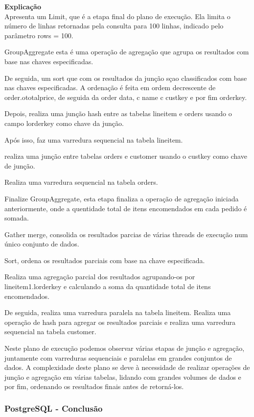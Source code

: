 \documentclass{article}
\begin{document}
\begin{lstlisting}[language=SQL]
\end{lstlisting}

\textbf{Explicação}\\
Apresenta um Limit, que é a etapa final do plano de execução. Ela limita o número de linhas retornadas pela consulta para 100 linhas, indicado pelo parâmetro rows = 100.

GroupAggregate esta é uma operação de agregação que agrupa os resultados com base nas chaves especificadas.

De seguida, um sort que com os resultados da junção sçao classificados com base nas chaves especificadas. A ordenação é feita em ordem decrescente de order.o\underline{}totalprice, de seguida da order data, c name c custkey e por fim orderkey.

Depois, realiza uma junção hash entre as tabelas lineitem e orders usando o campo l\underline{}orderkey como chave da junção.

Após isso, faz uma varredura sequencial na tabela lineitem.

realiza uma junção entre tabelas orders e customer usando o custkey como chave de junção.

Realiza uma varredura sequencial na tabela orders.

Finalize GroupAggregate, esta etapa finaliza a operação de agregação iniciada anteriormente, onde a quentidade total de itens encomendados em cada pedido é somada.

Gather merge, consolida os resultados parcias de várias threads de execução num único conjunto de dados.

Sort, ordena os resultados parciais com base na chave especificada.

Realiza uma agregação parcial dos resultados agrupando-os por lineitem\underline{}1.l\underline{}orderkey e calculando a soma da quantidade total de itens encomendados.

De seguida, realiza uma varredura paralela na tabela lineitem. Realiza uma operação de hash para agregar os resultados parciais e realiza uma varredura sequencial na tabela customer.

Neste plano de execução podemos observar várias etapas de junção e agregação, juntamente com varreduras sequenciais e paralelas em grandes conjuntos de dados. A complexidade deste plano se deve à necessidade de realizar operações de junção e agregação em várias tabelas, lidando com grandes volumes de dados e por fim, ordenando os resultados finais antes de retorná-los.
\subsubsection{PostgreSQL - Conclusão}
\end{document}
